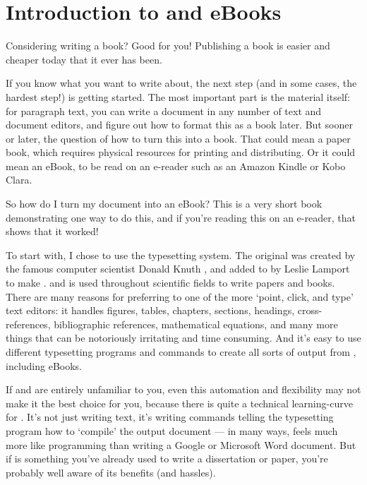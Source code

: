 
\chapter{Introduction to \latex and eBooks}

Considering writing a book? Good for you! Publishing a book is easier and cheaper today 
that it ever has been. 

If you know what you want to write about, the next step (and in some cases, the 
hardest step!) is getting started. The most important part is the material itself: 
for paragraph text, you can write a document in any number of text and document editors, 
and figure out how to format this as a book later. But sooner or later, 
the question of how to turn this into a book. That could mean a paper book, 
which requires physical resources for printing and distributing. Or it could mean
an eBook, to be read on an e-reader such as an Amazon Kindle or Kobo Clara.

So how do I turn my document into an eBook? This is a very short book demonstrating one 
way to do this, and if you're reading this on an e-reader, that shows that it worked!

To start with, I chose to use the \latex typesetting system. 
The original \tex was created by the famous computer scientist Donald Knuth \cite{knuth1984texbook}, and added to by Leslie Lamport to make \latex \cite{lamport1985i1}.
and is used throughout scientific fields to write papers and books. There are many
reasons for preferring \latex to one of the more `point, click, and type' text editors:
it handles figures, tables, chapters, sections, headings, cross-references, 
bibliographic references, mathematical equations, and many more things that can be 
notoriously irritating and time consuming. And it's easy to use different typesetting
programs and commands to create all sorts of output from \latex, including eBooks.


If \tex and \latex are entirely unfamiliar to you, even this automation and flexibility 
may not make it the best choice for you, because there is quite a technical 
learning-curve for \latex. It's not just writing text, it's writing commands telling the
typesetting program how to `compile' the output document --- in many ways, \latex
feels much more like programming than writing a Google or Microsoft Word document. But if
\latex is something you've already used to write a dissertation or paper, you're 
probably well aware of its benefits (and hassles). 


